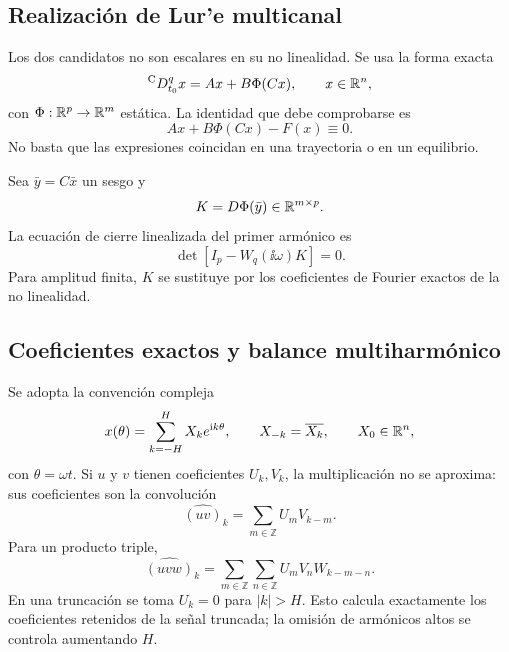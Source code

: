 \subsection{Realización de Lur'e multicanal}

Los dos candidatos no son escalares en su no linealidad. Se usa la forma exacta
\begin{equation}
 {}^{\mathrm C}D_{t_0}^{q}x=Ax+B\Phi(Cx),
 \qquad x\in\mathbb{R}^n,
 \label{nc:eq:mimo-lure}
\end{equation}
con \(\Phi:\mathbb{R}^p\to\mathbb{R}^m\) estática. La identidad que debe comprobarse es
\begin{equation}
 Ax+B\Phi(Cx)-F(x)\equiv0.
 \label{nc:eq:lure-residual}
\end{equation}
No basta que las expresiones coincidan en una trayectoria o en un equilibrio.

Sea \(\bar y=C\bar x\) un sesgo y
\begin{equation}
 K=D\Phi(\bar y)\in\mathbb{R}^{m\times p}.
\end{equation}
La ecuación de cierre linealizada del primer armónico es
\begin{equation}
 \det\!\left[I_p-W_q(\ii\omega)K\right]=0.
 \label{nc:eq:det-closure}
\end{equation}
Para amplitud finita, \(K\) se sustituye por los coeficientes de Fourier
exactos de la no linealidad.

\subsection{Coeficientes exactos y balance multiharmónico}

Se adopta la convención compleja
\begin{equation}
 x(\theta)=\sum_{k=-H}^{H}X_k e^{\mathrm{i} k\theta},
 \qquad X_{-k}=\overline{X_k},\qquad X_0\in\mathbb{R}^n,
 \label{nc:eq:fourier-state}
\end{equation}
con \(\theta=\omega t\). Si \(u\) y \(v\) tienen coeficientes \(U_k,V_k\),
la multiplicación no se aproxima: sus coeficientes son la convolución
\begin{equation}
 \widehat{(uv)}_k=\sum_{m\in\mathbb Z}U_mV_{k-m}.
 \label{nc:eq:conv2}
\end{equation}
Para un producto triple,
\begin{equation}
 \widehat{(uvw)}_k
 =\sum_{m\in\mathbb Z}\sum_{n\in\mathbb Z}
 U_mV_nW_{k-m-n}.
 \label{nc:eq:conv3}
\end{equation}
En una truncación se toma \(U_k=0\) para \(|k|>H\). Esto calcula exactamente
los coeficientes retenidos de la señal truncada; la omisión de armónicos altos
se controla aumentando \(H\).

